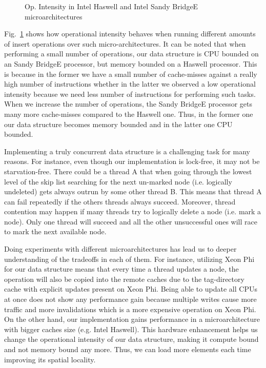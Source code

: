 \begin{figure}[t]
	\centering
	
	\caption{Op. Intensity in Intel Haswell and Intel Sandy BridgeE microarchitectures}
	\label{fig:haswell_ivybridge}
\end{figure}

Fig.~\ref{fig:haswell_ivybridge} shows how operational intensity behaves when running different amounts of insert operations over such micro-architectures. It can be noted that when performing a small number of operations, our data structure is CPU bounded on an Sandy BridgeE processor, but memory bounded on a Haswell processor. This is because in the former we have a small number of cache-misses against a really high number of instructions whether in the latter we observed a low operational intensity because we need less number of instructions for performing such tasks. When we increase the number of operations, the Sandy BridgeE processor gets many more cache-misses compared to the Haswell one. Thus, in the former one our data structure becomes memory bounded and in the latter one CPU bounded.

Implementing a truly concurrent data structure is a challenging task for many reasons. For instance, even though our implementation is lock-free, it may not be starvation-free. There could be a thread A that when going through the lowest level of the skip list searching for the next un-marked node (i.e. logically undeleted) gets always outrun by some other thread B. This means that thread A can fail repeatedly if the others threads always succeed. Moreover, thread contention may happen if many threads try to logically delete a node (i.e. mark a node). Only one thread will succeed and all the other unsuccessful ones will race to mark
the next available node.

Doing experiments with different microarchitectures has lead us to deeper understanding of the tradeoffs in each of them. For instance, utilizing Xeon Phi for our data structure means that every time a thread updates a node, the operation will also be copied into the remote caches due to the tag-directory cache with explicit updates present on Xeon Phi. Being able to update all CPUs at once does not show any performance gain because multiple writes cause more traffic and more invalidations which is a more expensive operation on Xeon Phi. On the other hand, our implementation gains performance in a microarchitecture with bigger caches size (e.g. Intel Haswell). This hardware enhancement helps us change the operational intensity of our data structure, making it compute bound and not memory bound any more. Thus, we can load more elements each time improving its spatial locality.
